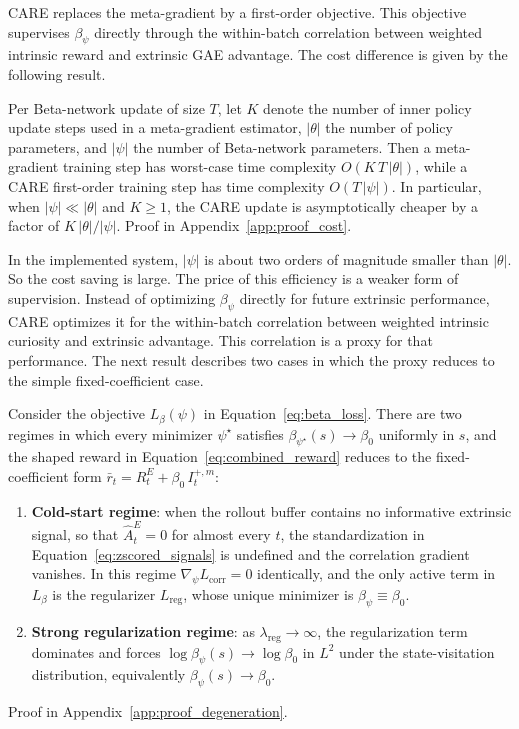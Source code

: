 CARE replaces the meta-gradient by a first-order objective. This objective supervises $\beta_\psi$ directly through the within-batch correlation between weighted intrinsic reward and extrinsic GAE advantage. The cost difference is given by the following result.

\begin{proposition}
\label{prop:cost}
Per Beta-network update of size $T$, let $K$ denote the number of inner policy update steps used in a meta-gradient estimator, $|\theta|$ the number of policy parameters, and $|\psi|$ the number of Beta-network parameters. Then a meta-gradient training step has worst-case time complexity $O(K\, T\, |\theta|)$, while a CARE first-order training step has time complexity $O(T\, |\psi|)$. In particular, when $|\psi| \ll |\theta|$ and $K \ge 1$, the CARE update is asymptotically cheaper by a factor of $K\, |\theta| / |\psi|$.
Proof in Appendix~\ref{app:proof_cost}.
\end{proposition}

In the implemented system, $|\psi|$ is about two orders of magnitude smaller than $|\theta|$. So the cost saving is large. The price of this efficiency is a weaker form of supervision. Instead of optimizing $\beta_\psi$ directly for future extrinsic performance, CARE optimizes it for the within-batch correlation between weighted intrinsic curiosity and extrinsic advantage. This correlation is a proxy for that performance. The next result describes two cases in which the proxy reduces to the simple fixed-coefficient case.

\begin{corollary}
\label{cor:degeneration}
Consider the objective $L_\beta(\psi)$ in Equation~\eqref{eq:beta_loss}. There are two regimes in which every minimizer $\psi^\star$ satisfies $\beta_{\psi^\star}(s) \to \beta_0$ uniformly in $s$, and the shaped reward in Equation~\eqref{eq:combined_reward} reduces to the fixed-coefficient form $\bar r_t = R_t^E + \beta_0\, I_t^{+,m}$:
\begin{enumerate}
    \item[(i)] \textbf{Cold-start regime}: when the rollout buffer contains no informative extrinsic signal, so that $\hat A_t^{E} = 0$ for almost every $t$, the standardization in Equation~\eqref{eq:zscored_signals} is undefined and the correlation gradient vanishes. In this regime $\nabla_\psi L_\text{corr} = 0$ identically, and the only active term in $L_\beta$ is the regularizer $L_\text{reg}$, whose unique minimizer is $\beta_\psi \equiv \beta_0$.
    \item[(ii)] \textbf{Strong regularization regime}: as $\lambda_\text{reg} \to \infty$, the regularization term dominates and forces $\log \beta_\psi(s) \to \log \beta_0$ in $L^2$ under the state-visitation distribution, equivalently $\beta_\psi(s) \to \beta_0$.
\end{enumerate}
Proof in Appendix~\ref{app:proof_degeneration}.
\end{corollary}

